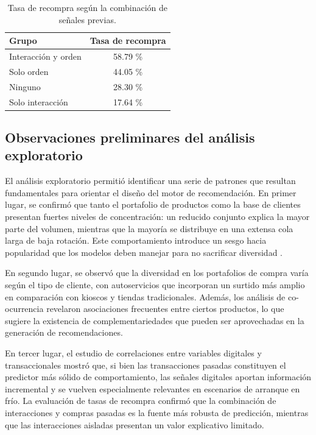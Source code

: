 \begin{table}[h]
	\centering
	\caption[Tasa de recompra por combinación de señales]{Tasa de recompra según la combinación de señales previas.}
	\begin{tabular}{l c}    
		\toprule
		\textbf{Grupo}     & \textbf{Tasa de recompra}\\
		\midrule
		Interacción y orden & 58.79 \% \\
		Solo orden & 44.05 \% \\
		Ninguno & 28.30 \% \\
		Solo interacción & 17.64 \% \\
		\bottomrule
		\hline
	\end{tabular}
	\label{tab:tasa_recompra}
\end{table}

\subsection{Observaciones preliminares del análisis exploratorio}

El análisis exploratorio permitió identificar una serie de patrones que resultan fundamentales para orientar el diseño del motor de recomendación. En primer lugar, se confirmó que tanto el portafolio de productos como la base de clientes presentan fuertes niveles de concentración: un reducido conjunto explica la mayor parte del volumen, mientras que la mayoría se distribuye en una extensa cola larga de baja rotación. Este comportamiento introduce un sesgo hacia popularidad que los modelos deben manejar para no sacrificar diversidad \cite{BOOK:Anderson2006}.

En segundo lugar, se observó que la diversidad en los portafolios de compra varía según el tipo de cliente, con autoservicios que incorporan un surtido más amplio en comparación con kioscos y tiendas tradicionales. Además, los análisis de co-ocurrencia revelaron asociaciones frecuentes entre ciertos productos, lo que sugiere la existencia de complementariedades que pueden ser aprovechadas en la generación de recomendaciones.  

En tercer lugar, el estudio de correlaciones entre variables digitales y transaccionales mostró que, si bien las transacciones pasadas constituyen el predictor más sólido de comportamiento, las señales digitales aportan información incremental y se vuelven especialmente relevantes en escenarios de arranque en frío. La evaluación de tasas de recompra confirmó que la combinación de interacciones y compras pasadas es la fuente más robusta de predicción, mientras que las interacciones aisladas presentan un valor explicativo limitado.  

